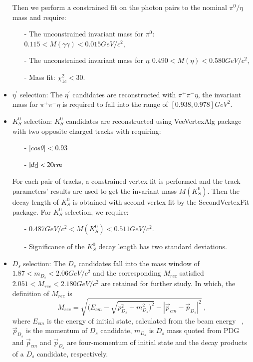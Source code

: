 \begin{itemize}
		Then we perform a constrained fit on the photon pairs to the nominal $\pi^{0}/\eta$ mass and require:
		\begin{itemize}
			\item[-] The unconstrained invariant mass for $\pi^{0}$: $0.115 < M(\gamma\gamma) < 0.015 GeV/c^{2}$,
			\item[-] The unconstrained invariant mass for $\eta: 0.490 < M(\eta) < 0.580 GeV/c^{2}$,
			\item[-] Mass fit: $\chi_{1c}^{2} < 30$.
		\end{itemize}
	\item $\eta^{'}$ selection: The $\eta^{'}$ candidates are reconstructed with $\pi^{+}\pi^{-}\eta$, the invariant mass for $\pi^{+}\pi^{-}\eta$ is required to fall into the range of $[0.938, 0.978] GeV^{2}$.
	\item $K_{S}^{0}$ selection: $K_{S}^{0}$ candidates are reconstructed using VeeVertexAlg package with two opposite charged tracks with requiring:
		\begin{itemize}
			\item[-] $|cos\theta| < 0.93$
			\item[-] $|dz| < 20 \emph{cm} $
		\end{itemize}

		For each pair of tracks, a constrained vertex fit is performed and the track parameters' results are used to get the invariant mass $M(K_{S}^{0})$. Then the decay length of $K_{S}^{0}$ is obtained with second vertex 
		fit by the SecondVertexFit package. For $K_{S}^{0}$ selection, we require:
		\begin{itemize}
			\item[-] $0.487GeV/c^{2} < M(K_S^{0}) < 0.511 GeV/c^{2}$.
			\item[-] Significance of the $K_{S}^{0}$ decay length has two standard deviations.
		\end{itemize}

	\item $D_{s}$ selection: The $D_{s}$ candidates fall into the mass window of $1.87 < m_{D_{s}} < 2.06 GeV/c^{2}$ and 
		the corresponding $M_{rec}$ satisfied $2.051 < M_{rec} < 2.180 GeV/c^{2}$ are retained for further study. In which, the definition of $M_{rec}$ is
		\begin{equation}
			M_{rec} = \sqrt{(E_{cm} - \sqrt{p_{D_{s}}^{2} + m_{D_{s}}^{2})^{2}} - |\vec p_{cm} - \vec p_{D_{s}} | ^{2}} \; , \label{con:inventoryflow}
		\end{equation}
		where $E_{cm}$ is the energy of initial state, calculated from the beam energy ~\cite{DocDB 580-v1}, $\vec p_{D_{s}}$ is the momentum of $D_{s}$ candidate, $m_{D_{s}}$ is $D_{s}$ mass quoted from PDG ~\cite{PDG} and $\vec p_{cm}$ and $\vec p_{D_{s}}$ are four-momentum of initial state and the decay products of a $D_{s}$ candidate, respectively.
\end{itemize}

